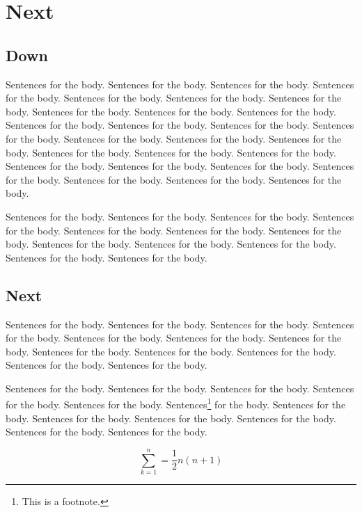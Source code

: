 \section{Next}

\subsection{Down}

Sentences for the body.  Sentences for the body.  Sentences for the body.
Sentences for the body.  Sentences for the body.  Sentences for the body.
Sentences for the body.  Sentences for the body.  Sentences for the body.
Sentences for the body.  Sentences for the body.  Sentences for the body.
Sentences for the body.  Sentences for the body.  Sentences for the body.
Sentences for the body.  Sentences for the body.  Sentences for the body.
Sentences for the body.  Sentences for the body.  Sentences for the body.
Sentences for the body.  Sentences for the body.  Sentences for the body.
Sentences for the body.  Sentences for the body.  Sentences for the body.

Sentences for the body.  Sentences for the body.  Sentences for the body.
Sentences for the body.  Sentences for the body.  Sentences for the body.
Sentences for the body.  Sentences for the body.  Sentences for the body.
Sentences for the body.  Sentences for the body.  Sentences for the body.

\subsection{Next}

Sentences for the body.  Sentences for the body.  Sentences for the body.
Sentences for the body.  Sentences for the body.  Sentences for the body.
Sentences for the body.  Sentences for the body.  Sentences for the body.
Sentences for the body.  Sentences for the body.  Sentences for the body.

Sentences for the body.  Sentences for the body.  Sentences for the body.
Sentences for the body.  Sentences for the body.  Sentences\footnote{
This is a footnote.} for the body.
Sentences for the body.  Sentences for the body.  Sentences for the body.
Sentences for the body.  Sentences for the body.  Sentences for the body.

\begin{equation}\label{eq:sample}
 \sum_{k = 1}^{n} = \frac{1}{2}n(n+1)
\end{equation}

